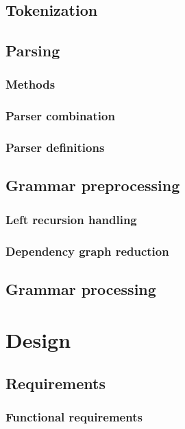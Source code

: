 \documentclass[english,engineering]{wizthesis}
\begin{document}
\section{Tokenization}

\section{Parsing}

\subsection{Methods}

\subsection{Parser combination}

\subsection{Parser definitions}

\section{Grammar preprocessing}

\subsection{Left recursion handling}

\subsection{Dependency graph reduction}

\section{Grammar processing}

\chapter{Design}

\section{Requirements}

\subsection{Functional requirements}
\end{document}
